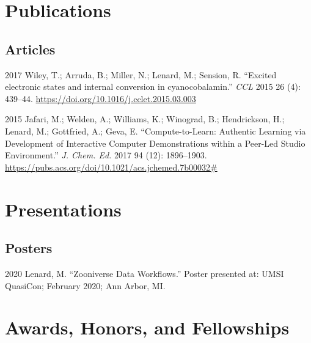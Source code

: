 \documentclass[12pt,letterpaper]{report}
\begin{document}
    \section*{Publications}

    \subsection*{Articles}

    \begin{tablist}
   
        \item[2017] \tab Wiley, T.; Arruda, B.; Miller, N.; Lenard, M.; Sension, R. \enquote{Excited electronic states and internal conversion in cyanocobalamin.} \textit{CCL} 2015 26 (4): 439--44. \href{DOI}{https://doi.org/10.1016/j.cclet.2015.03.003}

        \item[2015] \tab Jafari, M.; Welden, A.; Williams, K.; Winograd, B.; Hendrickson, H.; Lenard, M.; Gottfried, A.; Geva, E. \enquote{Compute-to-Learn: Authentic Learning via Development of Interactive Computer Demonstrations within a Peer-Led Studio Environment.} \textit{J. Chem. Ed.} 2017 94 (12): 1896--1903. \href{DOI}{https://pubs.acs.org/doi/10.1021/acs.jchemed.7b00032#}

    \end{tablist}



    \section*{Presentations}
    
    \subsection*{Posters}
    
    \begin{tablist}
    
        \item[2020] \tab Lenard, M. \enquote{Zooniverse Data Workflows.} Poster presented at: UMSI QuasiCon; February 2020; Ann Arbor, MI.

    \end{tablist}
    
    

    \section*{Awards, Honors, and Fellowships}
\end{document}
